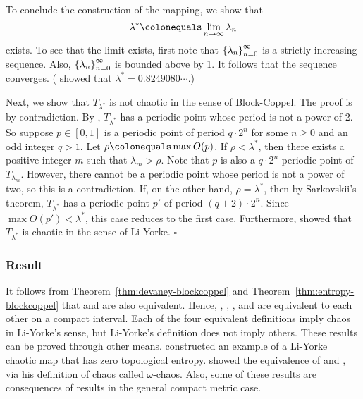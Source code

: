\documentclass[10pt,twoside,draft]{book}
\begin{document}
\begin{example}
To conclude the construction of the mapping, we show that
\begin{equation*}
  \lambda^* \ceq \lim\limits_{n \to \infty} \lambda_n
\end{equation*}
exists.
To see that the limit exists, first note that $\left \{ \lambda_n \right \}^{\infty}_{n = 0}$ is a strictly increasing sequence.
Also, $\left \{ \lambda_n \right \}^{\infty}_{n = 0}$ is bounded above by 1.
It follows that the sequence converges.
(\citet{misiurewicz1} showed that $\lambda^* = 0.8249080 \cdots$.)

Next, we show that $T_{\lambda^*}$ is not chaotic in the sense of Block-Coppel.
The proof is by contradiction.
By \citet[II, Theorem 14]{blockcoppel}, $T_{\lambda^*}$ has a periodic point whose period is not a power of 2.
So suppose $p \in [0,1]$ is a periodic point of period $q\cdot 2^n$ for some $n \geq 0$ and an odd integer $q > 1$.
Let $\rho \ceq \max O(p)$.
If $\rho < \lambda^*$, then there exists a positive integer $m$ such that $\lambda_m > \rho$.
Note that $p$ is also a $q\cdot 2^n$-periodic point of $T_{\lambda_m}$.
However, there cannot be a periodic point whose period is not a power of two, so this is a contradiction.
If, on the other hand, $\rho = \lambda^*$, then by Sarkovskii's theorem, $T_{\lambda^*}$ has a periodic point $p'$ of period $(q+2)\cdot 2^n$.
Since $\max O(p') < \lambda^*$, this case reduces to the first case.
Furthermore, \citet[p.146]{blockcoppel} showed that $T_{\lambda^*}$ is chaotic in the sense of Li-Yorke. $\square$
\label{eg:counterexample}
\end{example}

\subsubsection*{Result}
It follows from Theorem~\ref{thm:devaney-blockcoppel} and Theorem~\ref{thm:entropy-blockcoppel} that \dev and \pte are also equivalent.
Hence, \dev, \wig, \blcp, and \pte are equivalent to each other on a compact interval.
Each of the four equivalent definitions imply chaos in Li-Yorke's sense, but Li-Yorke's definition does not imply others.
These results can be proved through other means.
\citet{smital} constructed an example of a Li-Yorke chaotic map that has zero topological entropy.
\citet{omegachaos} showed the equivalence of \dev and \pte, via his definition of chaos called $\omega$-chaos.
Also, some of these results are consequences of results in the general compact metric case.
\end{document}
